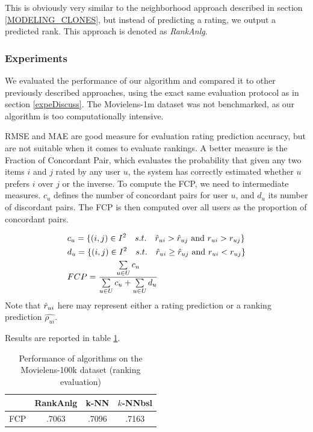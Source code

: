 This is obviously very similar to the neighborhood approach described in
section \ref{MODELING_CLONES}, but instead of predicting a rating, we output a
predicted rank. This approach is denoted as \textit{RankAnlg}.


\subsubsection{Experiments}

We evaluated the performance of our algorithm and compared it to other
previously described approaches, using the exact same evaluation protocol as in
section \ref{expeDiscuss}. The Movielens-1m dataset was not benchmarked, as our
algorithm is too computationally intensive.

RMSE and MAE are good measure for evaluation rating prediction accuracy, but
are not suitable when it comes to evaluate rankings. A better measure is the
Fraction of Concordant Pair, which evaluates the probability that given any two
items $i$ and $j$ rated by any user $u$, the system has correctly estimated
whether $u$ prefers $i$ over $j$ or the inverse. To compute the FCP, we need to
intermediate measures. $c_u$ defines the number of concordant pairs for user
$u$, and $d_u$ its number of discordant pairs. The FCP is then computed over all
users as the proportion of concordant pairs.

\begin{align*}
&c_u = \{(i, j) \in I^2 \quad s.t. \quad \hat{r}_{ui} > \hat{r}_{uj} \text{ and }
r_{ui} > r_{uj}\}\\
&d_u = \{(i, j) \in I^2 \quad s.t. \quad \hat{r}_{ui} \geq \hat{r}_{uj} \text{ and }
r_{ui} < r_{uj}\}\\
&FCP = \frac{\sum\limits_{u \in U} c_u}{\sum\limits_{u \in U} c_u + \sum\limits_{u \in U} d_u}
\end{align*}
Note that $\hat{r}_{ui}$ here may represent either a rating prediction or a
ranking prediction $\hat{\rho_{ui}}$.

Results are reported in table \ref{table:res100kRank}.

\begin{table}[!ht]
\centering
\caption{Performance of algorithms on the Movielens-100k dataset (ranking
evaluation)}
\label{table:res100kRank}
\begin{tabular}{| c || c | c | c |}
\toprule
     & RankAnlg &  k-NN & $k$-NNbsl\\
\midrule
FCP  &  .7063   & .7096 &  .7163   \\
\bottomrule
\end{tabular}
\end{table}

